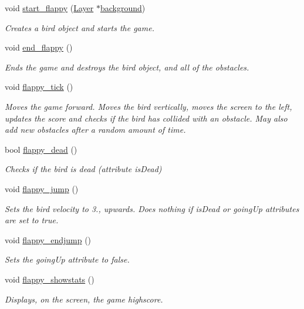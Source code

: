 \begin{DoxyCompactItemize}
void \mbox{\hyperlink{group__flappy_ga5c94499758654ce3c58278cdacb968c2}{start\+\_\+flappy}} (\mbox{\hyperlink{struct_layer}{Layer}} $\ast$\mbox{\hyperlink{wordpicker_8c_a202b703352248e94db55f961e7938e08}{background}})
\begin{DoxyCompactList}\small\item\em Creates a bird object and starts the game. \end{DoxyCompactList}\item 
void \mbox{\hyperlink{group__flappy_gae94076e45a9cafba1b36efea470aea73}{end\+\_\+flappy}} ()
\begin{DoxyCompactList}\small\item\em Ends the game and destroys the bird object, and all of the obstacles. \end{DoxyCompactList}\item 
void \mbox{\hyperlink{group__flappy_ga8efa272248ce46f0bb6081dcb680598d}{flappy\+\_\+tick}} ()
\begin{DoxyCompactList}\small\item\em Moves the game forward. Moves the bird vertically, moves the screen to the left, updates the score and checks if the bird has collided with an obstacle. May also add new obstacles after a random amount of time. \end{DoxyCompactList}\item 
bool \mbox{\hyperlink{group__flappy_ga0f81030140c19deb72d5f033591450a8}{flappy\+\_\+dead}} ()
\begin{DoxyCompactList}\small\item\em Checks if the bird is dead (attribute is\+Dead) \end{DoxyCompactList}\item 
void \mbox{\hyperlink{group__flappy_ga204fac24b177bdc6293d3284fab9d771}{flappy\+\_\+jump}} ()
\begin{DoxyCompactList}\small\item\em Sets the bird velocity to 3., upwards. Does nothing if is\+Dead or going\+Up attributes are set to true. \end{DoxyCompactList}\item 
void \mbox{\hyperlink{group__flappy_ga321a721b58061dddbdae841607210cf0}{flappy\+\_\+endjump}} ()
\begin{DoxyCompactList}\small\item\em Sets the going\+Up attribute to false. \end{DoxyCompactList}\item 
void \mbox{\hyperlink{group__flappy_ga2a15bc1d4bff96014dcaa54973162a48}{flappy\+\_\+showstats}} ()
\begin{DoxyCompactList}\small\item\em Displays, on the screen, the game highscore. \end{DoxyCompactList}\end{DoxyCompactItemize}
